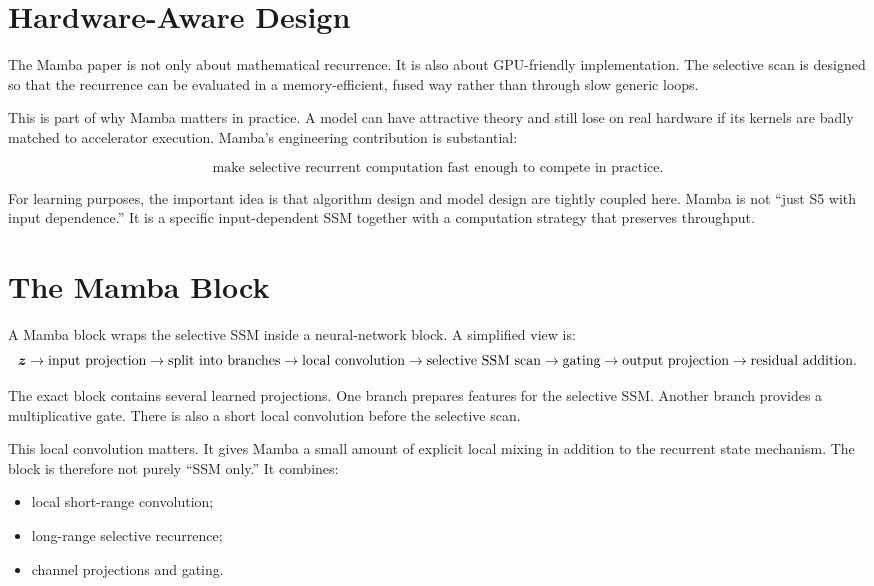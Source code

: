 \section{Hardware-Aware Design}

The Mamba paper is not only about mathematical recurrence. It is also about GPU-friendly
implementation. The selective scan is designed so that the recurrence can be evaluated in
a memory-efficient, fused way rather than through slow generic loops.

This is part of why Mamba matters in practice. A model can have attractive theory and
still lose on real hardware if its kernels are badly matched to accelerator execution.
Mamba's engineering contribution is substantial:

\[
  \text{make selective recurrent computation fast enough to compete in practice.}
\]

For learning purposes, the important idea is that algorithm design and model design are
tightly coupled here. Mamba is not ``just S5 with input dependence.'' It is a specific
input-dependent SSM together with a computation strategy that preserves throughput.

\section{The Mamba Block}

A Mamba block wraps the selective SSM inside a neural-network block. A simplified view is:
\[
  \bm{z}
  \rightarrow
  \text{input projection}
  \rightarrow
  \text{split into branches}
  \rightarrow
  \text{local convolution}
  \rightarrow
  \text{selective SSM scan}
  \rightarrow
  \text{gating}
  \rightarrow
  \text{output projection}
  \rightarrow
  \text{residual addition}.
\]

The exact block contains several learned projections. One branch prepares features for the
selective SSM. Another branch provides a multiplicative gate. There is also a short local
convolution before the selective scan.

This local convolution matters. It gives Mamba a small amount of explicit local mixing in
addition to the recurrent state mechanism. The block is therefore not purely ``SSM only.''
It combines:

\begin{itemize}
  \item local short-range convolution;
  \item long-range selective recurrence;
  \item channel projections and gating.
\end{itemize}

